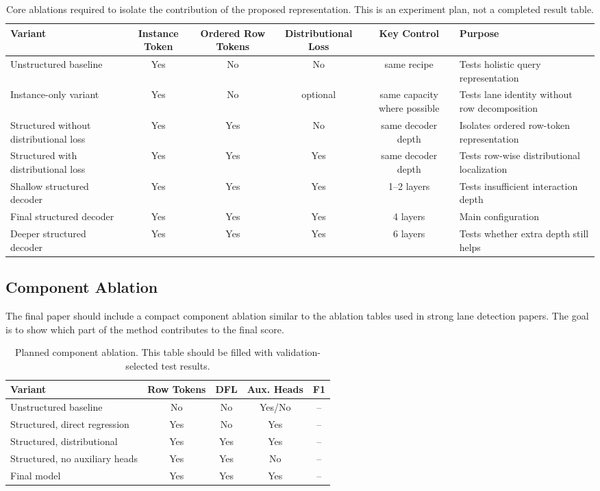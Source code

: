 \documentclass[conference]{IEEEtran}
\begin{document}
\begin{table}[t]
\centering
\caption{Core ablations required to isolate the contribution of the proposed representation. This is an experiment plan, not a completed result table.}
\label{tab:ablation-main}
\begin{tabular}{lccccp{5.5cm}}
\toprule
Variant & Instance Token & Ordered Row Tokens & Distributional Loss & Key Control & Purpose \\
\midrule
Unstructured baseline & Yes & No & No & same recipe & Tests holistic query representation \\
Instance-only variant & Yes & No & optional & same capacity where possible & Tests lane identity without row decomposition \\
Structured without distributional loss & Yes & Yes & No & same decoder depth & Isolates ordered row-token representation \\
Structured with distributional loss & Yes & Yes & Yes & same decoder depth & Tests row-wise distributional localization \\
Shallow structured decoder & Yes & Yes & Yes & 1--2 layers & Tests insufficient interaction depth \\
Final structured decoder & Yes & Yes & Yes & 4 layers & Main configuration \\
Deeper structured decoder & Yes & Yes & Yes & 6 layers & Tests whether extra depth still helps \\
\bottomrule
\end{tabular}
\end{table}

\subsection{Component Ablation}

The final paper should include a compact component ablation similar to the ablation tables used in strong lane detection papers. The goal is to show which part of the method contributes to the final score.

\begin{table}[t]
\centering
\caption{Planned component ablation. This table should be filled with validation-selected test results.}
\label{tab:component}
\begin{tabular}{lcccc}
\toprule
Variant & Row Tokens & DFL & Aux. Heads & F1 \\
\midrule
Unstructured baseline & No & No & Yes/No & -- \\
Structured, direct regression & Yes & No & Yes & -- \\
Structured, distributional & Yes & Yes & Yes & -- \\
Structured, no auxiliary heads & Yes & Yes & No & -- \\
Final model & Yes & Yes & Yes & -- \\
\bottomrule
\end{tabular}
\end{table}
\end{document}
